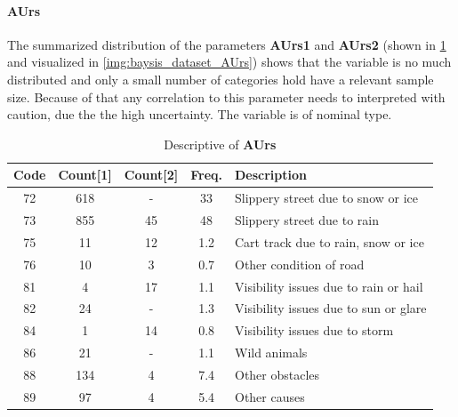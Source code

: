 \paragraph{AUrs}
\label{baysis_dataset_AUrs}
The summarized distribution of the parameters \textbf{AUrs1} and \textbf{AUrs2} (shown in \cref{tbl:baysis_dataset_AUrs} and visualized in \cref{img:baysis_dataset_AUrs}) shows that the variable is no much distributed and only a small number of categories hold have a relevant sample size. Because of that any correlation to this parameter needs to interpreted with caution, due the the high uncertainty. The variable is of nominal type.
\begin{table}[ht]
	\centering
	\small
	\begin{tabular}{c|c|c|c|l}
		\toprule
		Code & Count[1] & Count[2] & Freq. & Description \\ 
		\midrule
		72 & 618	& -		& 33  & Slippery street due to snow or ice \\
		73 & 855	& 45	& 48  & Slippery street due to rain \\
		75 & 11		& 12	& 1.2 & Cart track due to rain, snow or ice \\
		76 & 10		& 3		& 0.7 & Other condition of road \\
		81 & 4		& 17 	& 1.1 & Visibility issues due to rain or hail \\
		82 & 24		& -		& 1.3 & Visibility issues due to sun or glare \\
		84 & 1		& 14	& 0.8 & Visibility issues due to storm \\
		86 & 21		& -		& 1.1 & Wild animals \\
		88 & 134	& 4		& 7.4 & Other obstacles \\
		89 & 97		& 4		& 5.4 & Other causes \\
		\bottomrule
	\end{tabular}
	\caption{Descriptive of \textbf{AUrs}}
	\label{tbl:baysis_dataset_AUrs}
	\vspace{-8mm}
\end{table}
